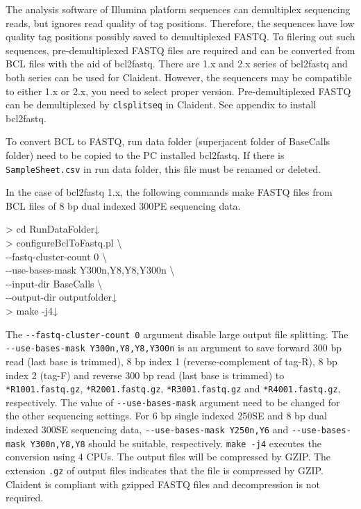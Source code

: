 \documentclass[titlepage,10pt,a4paper,english]{jsbook}
\newenvironment{cmd}{\begin{oframed}\raggedright\ttfamily\footnotesize\setlength{\baselineskip}{1.4em}}{\end{oframed}\vspace{-1em}}
\begin{document}
The analysis software of Illumina platform sequences can demultiplex sequencing reads, but ignores read quality of tag positions.
Therefore, the sequences have low quality tag positions possibly saved to demultiplexed FASTQ.
To filering out such sequences, pre-demultiplexed FASTQ files are required and can be converted from BCL files with the aid of bcl2fastq.
There are 1.x and 2.x series of bcl2fastq and both series can be used for Claident.
However, the sequencers may be compatible to either 1.x or 2.x, you need to select proper version.
Pre-demultiplexed FASTQ can be demultiplexed by \texttt{clsplitseq} in Claident.
See appendix to install bcl2fastq.

To convert BCL to FASTQ, run data folder (superjacent folder of BaseCalls folder) need to be copied to the PC installed bcl2fastq.
If there is \texttt{SampleSheet.csv} in run data folder, this file must be renamed or deleted.

In the case of bcl2fastq 1.x, the following commands make FASTQ files from BCL files of 8 bp dual indexed 300PE sequencing data.
\begin{cmd}
{\textgreater} cd RunDataFolder↓\\
{\textgreater} configureBclToFastq.pl {\textbackslash}\\
{-}{-}fastq-cluster-count 0 {\textbackslash}\\
{-}{-}use-bases-mask Y300n,Y8,Y8,Y300n {\textbackslash}\\
{-}{-}input-dir BaseCalls {\textbackslash}\\
{-}{-}output-dir outputfolder↓\\
{\textgreater} make -j4↓
\end{cmd}
The \texttt{{-}{-}fastq-cluster-count 0} argument disable large output file splitting.
The \texttt{{-}{-}use-bases-mask Y300n,Y8,Y8,Y300n} is an argument to save forward 300 bp read (last base is trimmed), 8 bp index 1 (reverse-complement of tag-R), 8 bp index 2 (tag-F) and reverse 300 bp read (last base is trimmed) to \texttt{*{\textunderscore}R1{\textunderscore}001.fastq.gz}, \texttt{*{\textunderscore}R2{\textunderscore}001.fastq.gz}, \texttt{*{\textunderscore}R3{\textunderscore}001.fastq.gz} and \texttt{*{\textunderscore}R4{\textunderscore}001.fastq.gz}, respectively.
The value of \texttt{{-}{-}use-bases-mask} argument need to be changed for the other sequencing settings.
For 6 bp single indexed 250SE and 8 bp dual indexed 300SE sequencing data, \texttt{{-}{-}use-bases-mask Y250n,Y6} and \texttt{{-}{-}use-bases-mask Y300n,Y8,Y8} should be suitable, respectively.
\texttt{make -j4} executes the conversion using 4 CPUs.
The output files will be compressed by GZIP.
The extension \texttt{.gz} of output files indicates that the file is compressed by GZIP.
Claident is compliant with gzipped FASTQ files and decompression is not required.
\end{document}
